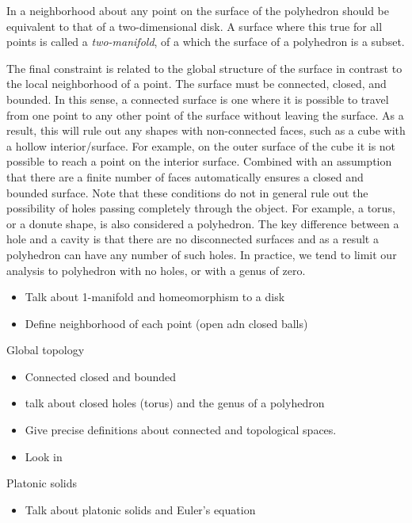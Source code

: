 In a neighborhood about any point on the surface of the polyhedron should be equivalent to that of a two-dimensional disk.
A surface where this true for all points is called a \textit{two-manifold}, of a which the surface of a polyhedron is a subset.

The final constraint is related to the global structure of the surface in contrast to the local neighborhood of a point.
The surface must be connected, closed, and bounded.
In this sense, a connected surface is one where it is possible to travel from one point to any other point of the surface without leaving the surface. 
As a result, this will rule out any shapes with non-connected faces, such as a cube with a hollow interior/surface.
For example, on the outer surface of the cube it is not possible to reach a point on the interior surface. 
Combined with an assumption that there are a finite number of faces automatically ensures a closed and bounded surface. 
Note that these conditions do not in general rule out the possibility of holes passing completely through the object.
For example, a torus, or a donute shape, is also considered a polyhedron.
The key difference between a hole and a cavity is that there are no disconnected surfaces and as a result a polyhedron can have any number of such holes. 
In practice, we tend to limit our analysis to polyhedron with no holes, or with a genus of zero.

\begin{itemize}
    \item Talk about 1-manifold and homeomorphism to a disk
    \item Define neighborhood of each point (open adn closed balls)
\end{itemize}

Global topology
\begin{itemize}
    \item Connected closed and bounded
    \item talk about closed holes (torus) and the genus of a polyhedron
    \item Give precise definitions about connected and topological spaces.
    \item Look in ~\cite{morris1988,hatcher2002}
\end{itemize}

Platonic solids
\begin{itemize}
    \item Talk about platonic solids and Euler's equation
\end{itemize}

